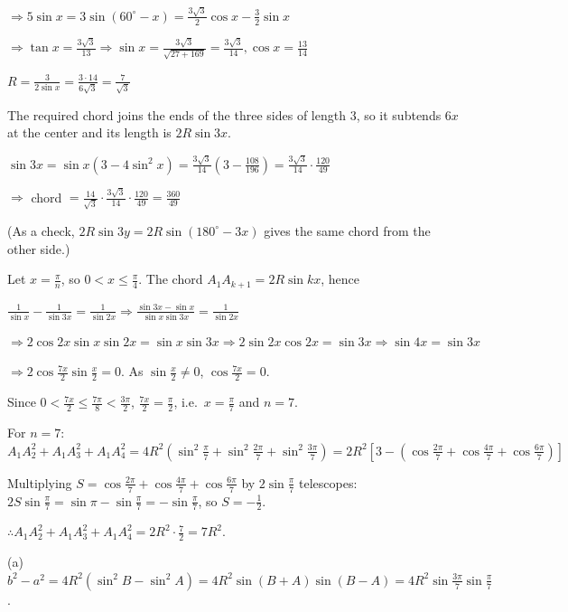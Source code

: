  $\Rightarrow 5\sin x = 3\sin(60^\circ - x) = \frac{3\sqrt{3}}{2}\cos x - \frac{3}{2}\sin x$

  $\Rightarrow \tan x = \frac{3\sqrt{3}}{13}\Rightarrow \sin x = \frac{3\sqrt{3}}{\sqrt{27 + 169}} =
  \frac{3\sqrt{3}}{14}, \cos x = \frac{13}{14}$

  $R = \frac{3}{2\sin x} = \frac{3\cdot14}{6\sqrt{3}} = \frac{7}{\sqrt{3}}$

  The required chord joins the ends of the three sides of length $3$, so it subtends $6x$ at the center and its
  length is $2R\sin3x$.

  $\sin3x = \sin x(3 - 4\sin^2x) = \frac{3\sqrt{3}}{14}\left(3 - \frac{108}{196}\right) =
  \frac{3\sqrt{3}}{14}\cdot\frac{120}{49}$

  $\Rightarrow$ chord $= \frac{14}{\sqrt{3}}\cdot\frac{3\sqrt{3}}{14}\cdot\frac{120}{49} = \frac{360}{49}$

  (As a check, $2R\sin3y = 2R\sin(180^\circ - 3x)$ gives the same chord from the other side.)
\item Let $x = \frac{\pi}{n}$, so $0 < x\leq\frac{\pi}{4}$. The chord $A_1A_{k + 1} = 2R\sin kx$, hence

  $\frac{1}{\sin x} - \frac{1}{\sin3x} = \frac{1}{\sin2x}\Rightarrow \frac{\sin3x - \sin x}{\sin x\sin3x} =
  \frac{1}{\sin2x}$

  $\Rightarrow 2\cos2x\sin x\sin2x = \sin x\sin3x\Rightarrow 2\sin2x\cos2x = \sin3x\Rightarrow \sin4x =
  \sin3x$

  $\Rightarrow 2\cos\frac{7x}{2}\sin\frac{x}{2} = 0$. As $\sin\frac{x}{2}\neq 0$, $\cos\frac{7x}{2} = 0$.

  Since $0 < \frac{7x}{2}\leq\frac{7\pi}{8} < \frac{3\pi}{2}$, $\frac{7x}{2} = \frac{\pi}{2}$, i.e.\ $x =
  \frac{\pi}{7}$ and $n = 7$.

  For $n = 7$: $A_1A_2^2 + A_1A_3^2 + A_1A_4^2 = 4R^2\left(\sin^2\frac{\pi}{7} + \sin^2\frac{2\pi}{7} +
  \sin^2\frac{3\pi}{7}\right) = 2R^2\left[3 - \left(\cos\frac{2\pi}{7} + \cos\frac{4\pi}{7} +
  \cos\frac{6\pi}{7}\right)\right]$

  Multiplying $S = \cos\frac{2\pi}{7} + \cos\frac{4\pi}{7} + \cos\frac{6\pi}{7}$ by $2\sin\frac{\pi}{7}$
  telescopes: $2S\sin\frac{\pi}{7} = \sin\pi - \sin\frac{\pi}{7} = -\sin\frac{\pi}{7}$, so $S =
  -\frac{1}{2}$.

  $\therefore A_1A_2^2 + A_1A_3^2 + A_1A_4^2 = 2R^2\cdot\frac{7}{2} = 7R^2$.
\item (a) $b^2 - a^2 = 4R^2(\sin^2B - \sin^2A) = 4R^2\sin(B + A)\sin(B - A) =
  4R^2\sin\frac{3\pi}{7}\sin\frac{\pi}{7}$.

